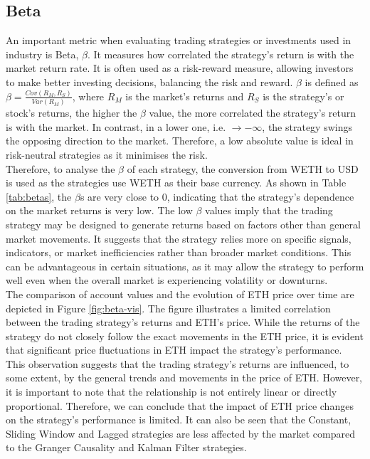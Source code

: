 \subsection{Beta}
An important metric when evaluating trading strategies or investments used in industry is Beta, $\beta$. It measures how correlated the strategy's return is with the market return rate. It is often used as a risk-reward measure, allowing investors to make better investing decisions, balancing the risk and reward. $\beta$ is defined as $\beta = \frac{Cov(R_M, R_S)}{Var(R_M)}$, where $R_M$ is the market's returns and $R_S$ is the strategy's or stock's returns, the higher the $\beta$ value, the more correlated the strategy's return is with the market. In contrast, in a lower one, i.e. $\rightarrow - \infty$, the strategy swings the opposing direction to the market. Therefore, a low absolute value is ideal in risk-neutral strategies as it minimises the risk.
\\[3mm]
Therefore, to analyse the $\beta$ of each strategy, the conversion from WETH to USD is used as the strategies use WETH as their base currency. As shown in Table \ref{tab:betas}, the $\beta$s are very close to 0, indicating that the strategy's dependence on the market returns is very low. The low $\beta$ values imply that the trading strategy may be designed to generate returns based on factors other than general market movements. It suggests that the strategy relies more on specific signals, indicators, or market inefficiencies rather than broader market conditions. This can be advantageous in certain situations, as it may allow the strategy to perform well even when the overall market is experiencing volatility or downturns.
\\[3mm]
The comparison of account values and the evolution of ETH price over time are depicted in Figure \ref{fig:beta-vis}. The figure illustrates a limited correlation between the trading strategy's returns and ETH's price. While the returns of the strategy do not closely follow the exact movements in the ETH price, it is evident that significant price fluctuations in ETH impact the strategy's performance. This observation suggests that the trading strategy's returns are influenced, to some extent, by the general trends and movements in the price of ETH. However, it is important to note that the relationship is not entirely linear or directly proportional. Therefore, we can conclude that the impact of ETH price changes on the strategy's performance is limited. It can also be seen that the Constant, Sliding Window and Lagged strategies are less affected by the market compared to the Granger Causality and Kalman Filter strategies.

